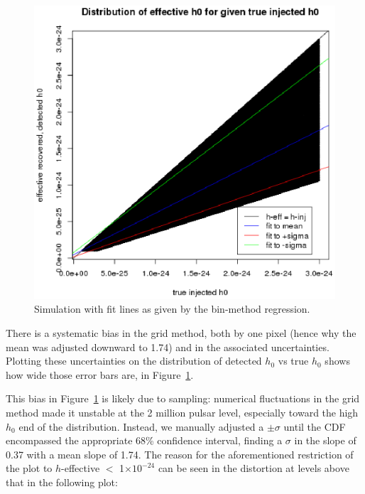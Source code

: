 \begin{figure}
\begin{center}
\includegraphics[width=0.3\paperwidth,height=0.2\paperheight]{PlotHEffVsH0TrueWithLines.eps}
\caption{Simulation with fit lines as given by the bin-method regression.
\label{fig:plotheffvsh0truewithlines}}
\end{center}
\end{figure}

There is a systematic bias in the grid method, both by one pixel (hence why the mean was adjusted downward to 1.74) and in the associated uncertainties. Plotting these uncertainties on the distribution of {detected $h_0$} vs {true $h_0$} shows how wide those error bars are, in Figure~\ref{fig:plotheffvsh0truewithlines}.


This bias in Figure~\ref{fig:plotheffvsh0truewithlines} is likely due to sampling: numerical fluctuations in the grid method made it unstable at the 2 million pulsar level, especially toward the high $h_0$ end of the distribution. Instead, we manually adjusted a $\pm \sigma$ until the CDF encompassed the appropriate 68\% confidence interval, finding a $\sigma$ in the slope of 0.37 with a mean slope of 1.74. The reason for the aforementioned restriction of the plot to $h$-effective $<$ 1$\times 10^{-24}$ can be seen in the distortion at levels above that in the following plot:

